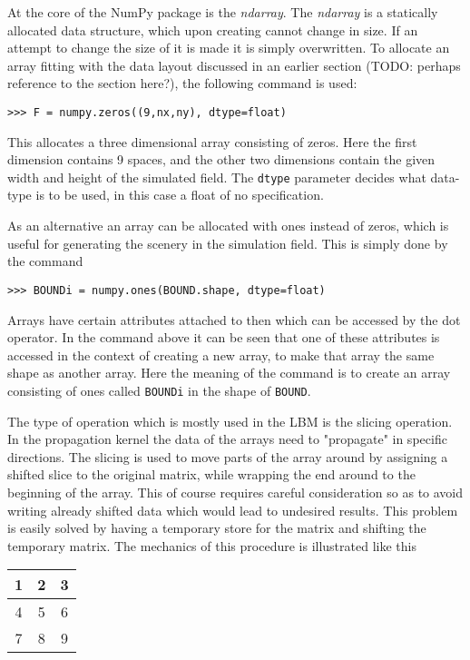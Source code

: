 At the core of the NumPy package is the \textit{ndarray}. The \textit{ndarray} is a statically allocated data structure, which upon creating cannot change in size. If an attempt to change the size of it is made it is simply overwritten. To allocate an array fitting with the data layout discussed in an earlier section (TODO: perhaps reference to the section here?), the following command is used:

\begin{verbatim}
>>> F = numpy.zeros((9,nx,ny), dtype=float)
\end{verbatim}

This allocates a three dimensional array consisting of zeros. Here the first dimension contains 9 spaces, and the other two dimensions contain the given width and height of the simulated field. The \texttt{dtype} parameter decides what data-type is to be used, in this case a float of no specification. 

As an alternative an array can be allocated with ones instead of zeros, which is useful for generating the scenery in the simulation field. This is simply done by the command

\begin{verbatim}
>>> BOUNDi = numpy.ones(BOUND.shape, dtype=float)
\end{verbatim}

Arrays have certain attributes attached to then which can be accessed by the dot operator. In the command above it can be seen that one of these attributes is accessed in the context of creating a new array, to make that array the same shape as another array. Here the meaning of the command is to create an array consisting of ones called \texttt{BOUNDi} in the shape of \texttt{BOUND}.

The type of operation which is mostly used in the LBM is the slicing operation. In the propagation kernel the data of the arrays need to "propagate" in specific directions. The slicing is used to move parts of the array around by assigning a shifted slice to the original matrix, while wrapping the end around to the beginning of the array. This of course requires careful consideration so as to avoid writing already shifted data which would lead to undesired results. This problem is easily solved by having a temporary store for the matrix and shifting the temporary matrix. The mechanics of this procedure is illustrated like this

\begin{tabular}{|c|c|c|}
\hline
1 & 2 & 3 \\
\hline
4 & 5 & 6 \\
\hline
7 & 8 & 9 \\
\hline
\end{tabular}

